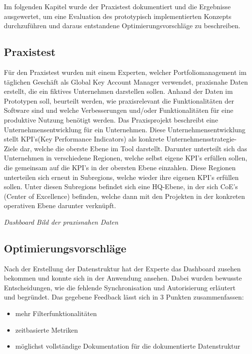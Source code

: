 Im folgenden Kapitel wurde der Praxistest dokumentiert und die Ergebnisse ausgewertet, um eine Evaluation des prototypisch implementierten Konzepts durchzuführen und daraus entstandene Optimierungsvorschläge zu beschreiben.
\subsection{Praxistest}
Für den Praxistest wurden mit einem Experten, welcher Portfoliomanagement im täglichen Geschäft als Global Key Account Manager verwendet, praxisnahe Daten erstellt, die ein fiktives Unternehmen darstellen sollen. Anhand der Daten im Prototypen soll, beurteilt werden, wie praxisrelevant die Funktionalitäten der Software sind und welche Verbesserungen und/oder Funktionalitäten für eine produktive Nutzung benötigt werden. Das Praxisprojekt beschreibt eine Unternehmensentwicklung für ein Unternehmen. Diese Unternehmensentwicklung stellt KPI's(Key Performance Indicators) als konkrete Unternehmensstrategie-Ziele dar, welche die oberste Ebene im Tool darstellt. Darunter unterteilt sich das Unternehmen in verschiedene Regionen, welche selbst eigene KPI's erfüllen sollen, die gemeinsam auf die KPI's in der obersten Ebene einzahlen. Diese Regionen unterteilen sich erneut in Subregions, welche wieder ihre eigenen KPI's erfüllen sollen. Unter diesen Subregions befindet sich eine HQ-Ebene, in der sich CoE's (Center of Excellence) befinden, welche dann mit den Projekten in der konkreten operativen Ebene darunter verknüpft.

\emph{Dashboard Bild der praxisnahen Daten}

\subsection{Optimierungsvorschläge}
Nach der Erstellung der Datenstruktur hat der Experte das Dashboard zusehen bekommen und konnte sich in der Anwendung ansehen. Dabei wurden bewusste Entscheidungen, wie die fehlende Synchronisation und Autorisierung erläutert und begründet.
Das gegebene Feedback lässt sich in 3 Punkten zusammenfassen:

\begin{itemize}
    \item mehr Filterfunktionalitäten
    \item zeitbasierte Metriken
    \item möglichst vollständige Dokumentation für die dokumentierte Datenstruktur
\end{itemize}

